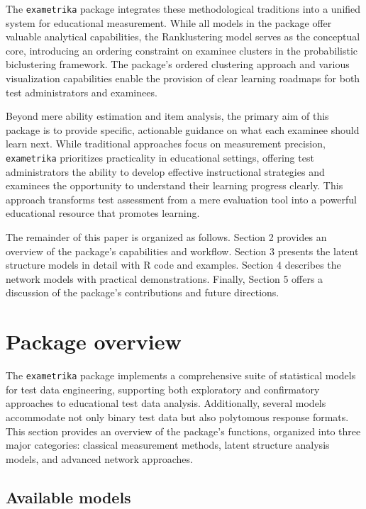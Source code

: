 The \texttt{exametrika} package integrates these methodological traditions into a unified system for educational measurement. While all models in the package offer valuable analytical capabilities, the Ranklustering model serves as the conceptual core, introducing an ordering constraint on examinee clusters in the probabilistic biclustering framework. The package's ordered clustering approach and various visualization capabilities enable the provision of clear learning roadmaps for both test administrators and examinees.

Beyond mere ability estimation and item analysis, the primary aim of this package is to provide specific, actionable guidance on what each examinee should learn next. While traditional approaches focus on measurement precision, \texttt{exametrika} prioritizes practicality in educational settings, offering test administrators the ability to develop effective instructional strategies and examinees the opportunity to understand their learning progress clearly. This approach transforms test assessment from a mere evaluation tool into a powerful educational resource that promotes learning.

The remainder of this paper is organized as follows. Section 2 provides an overview of the package's capabilities and workflow. Section 3 presents the latent structure models in detail with R code and examples. Section 4 describes the network models with practical demonstrations. Finally, Section 5 offers a discussion of the package's contributions and future directions.

\section{Package overview}\label{package-overview}

The \texttt{exametrika} package implements a comprehensive suite of statistical models for test data engineering, supporting both exploratory and confirmatory approaches to educational test data analysis. Additionally, several models accommodate not only binary test data but also polytomous response formats. This section provides an overview of the package's functions, organized into three major categories: classical measurement methods, latent structure analysis models, and advanced network approaches.

\subsection{Available models}\label{available-models}

